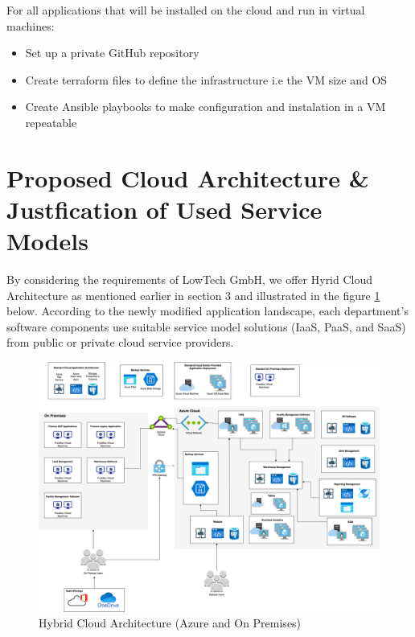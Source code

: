 \documentclass{llncs}
\begin{document}
For all applications that will be installed on the cloud and run in virtual machines:
\begin{itemize}
    \item Set up a private GitHub repository
    \item Create terraform files to define the infrastructure i.e the VM size and OS
    \item Create Ansible playbooks to make configuration and instalation in a VM repeatable
\end{itemize}

\section{Proposed Cloud Architecture \& Justfication of Used Service Models}
By considering the requirements of LowTech GmbH, we offer Hyrid Cloud Architecture as mentioned earlier in section 3 and illustrated in the figure \ref{Cloud_Architecture} below. According to the newly modified application landscape, each department's software components use suitable service model solutions (IaaS, PaaS, and SaaS) from public or private cloud service providers.

\begin{figure}[htbp]
    \begin{center}
        \includegraphics[width=1\textwidth]{diagrams/AzureArchCloud.png}
        \vspace{0.01\textwidth}
        \caption{Hybrid Cloud Architecture (Azure and On Premises)}
        \label{Cloud_Architecture} %
    \end{center}
\end{figure}
\end{document}
